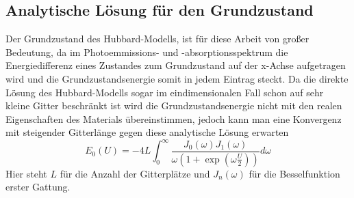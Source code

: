 \subsection{Analytische Lösung für den Grundzustand}
Der Grundzustand des Hubbard-Modells, ist für diese Arbeit von großer Bedeutung, da im Photoemmissions- und -absorptionsspektrum die Energiedifferenz eines Zustandes zum Grundzustand auf der x-Achse aufgetragen wird und die Grundzustandsenergie somit in jedem Eintrag steckt. Da die direkte Lösung des Hubbard-Modells sogar im eindimensionalen Fall schon auf sehr kleine Gitter beschränkt ist wird die Grundzustandsenergie nicht mit den realen Eigenschaften des Materials übereinstimmen, jedoch kann man eine Konvergenz mit steigender Gitterlänge gegen diese analytische Lösung erwarten
\begin{equation}\label{analytisch}
E_0(U)=-4L\int_{0}^{\infty}\frac{J_0(\omega)J_1(\omega)}{\omega\left( 1+\exp\left( \omega\frac{U}{2}\right) \right) }d\omega
\end{equation}\cite{Monien}
Hier steht $ L $ für die Anzahl der Gitterplätze und $ J_n(\omega) $ für die Besselfunktion erster Gattung.





